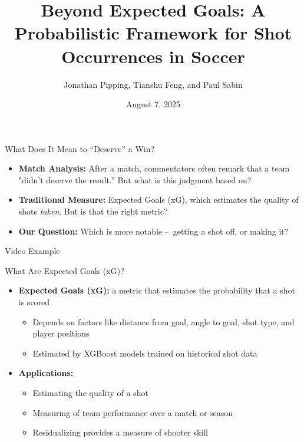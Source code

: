 \documentclass{beamer}
\title[Beyond Expected Goals]{Beyond Expected Goals: A Probabilistic Framework for Shot Occurrences in Soccer}
\author[Pipping, Feng, \& Sabin]{Jonathan Pipping, Tianshu Feng, and Paul Sabin}
\date{August 7, 2025}
\institute[UPenn]{University of Pennsylvania}
\begin{document}
\frame{\titlepage}

\begin{frame}[fragile]{What Does It Mean to ``Deserve'' a Win?}
\begin{itemize}
\item \textbf{Match Analysis:} After a match, commentators often remark that a team "didn't deserve the result." But what is this judgment based on?
\item \textbf{Traditional Measure:} Expected Goals (xG), which estimates the quality of shots \emph{taken}. But is that the right metric?
\item \textbf{Our Question:} Which is more notable – getting a shot off, or making it?
\end{itemize}
\end{frame}

\begin{frame}{Video Example}
\end{frame}

\begin{frame}{What Are Expected Goals (xG)?}
\begin{itemize}
\item \textbf{Expected Goals (xG):} a metric that estimates the probability that a shot is scored
\begin{itemize}
  \item Depends on factors like distance from goal, angle to goal, shot type, and player positions
  \item Estimated by XGBoost models trained on historical shot data
\end{itemize}
\item  \textbf{Applications:}
  \begin{itemize}
  \item Estimating the quality of a shot
  \item Measuring of team performance over a match or season
  \item Residualizing provides a measure of shooter skill
  \end{itemize}
\end{itemize}
\end{frame}
\end{document}
